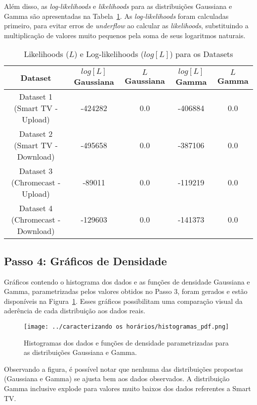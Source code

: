 Além disso, as \textit{log-likelihoods} e \textit{likelihoods} para as distribuições Gaussiana e Gamma são apresentadas na Tabela~\ref{tab:likelihoods}. As \textit{log-likelihoods} foram calculadas primeiro, para evitar erros de \textit{underflow} ao calcular as \textit{likelihoods}, substituindo a multiplicação de valores muito pequenos pela soma de seus logaritmos naturais.
\begin{table}[H]
    \centering
    \caption{Likelihoods ($L$) e Log-likelihoods ($log[L]$) para os Datasets}
    \label{tab:likelihoods}
    \begin{tabular}{|c|c|c|c|c|}
        \hline
        \textbf{Dataset} & \textbf{$log[L]$ Gaussiana} & \textbf{$L$ Gaussiana} & \textbf{$log[L]$ Gamma} & \textbf{$L$ Gamma} \\ 
        \hline
        Dataset 1 (Smart TV - Upload) & -424282 & 0.0 & -406884 & 0.0 \\ 
        \hline
        Dataset 2 (Smart TV - Download) & -495658 & 0.0 & -387106 & 0.0 \\ 
        \hline
        Dataset 3 (Chromecast - Upload) & -89011 & 0.0 & -119219 & 0.0 \\ 
        \hline
        Dataset 4 (Chromecast - Download) & -129603 & 0.0 & -141373 & 0.0 \\ 
        \hline
    \end{tabular}
\end{table}


\subsection{Passo 4: Gráficos de Densidade}

Gráficos contendo o histograma dos dados e as funções de densidade Gaussiana e Gamma, parametrizadas pelos valores obtidos no Passo 3, foram gerados e estão disponíveis na Figura~\ref{fig:histogramas_pdf}. Esses gráficos possibilitam uma comparação visual da aderência de cada distribuição aos dados reais.

\begin{figure}[H]
    \centering
    \texttt{[image: ../caracterizando os horários/histogramas\_pdf.png]}
    \caption{Histogramas dos dados e funções de densidade parametrizadas para as distribuições Gaussiana e Gamma.}
    \label{fig:histogramas_pdf}
\end{figure}

Observando a figura, é possível notar que nenhuma das distribuições propostas (Gaussiana e Gamma) se ajusta bem aos dados observados. A distribuição Gamma inclusive explode para valores muito baixos dos dados referentes a Smart TV. 

